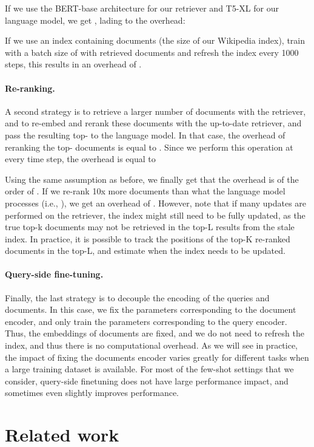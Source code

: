 \documentclass[10pt]{article} \usepackage[preprint]{tmlr}
\begin{document}
If we use the BERT-base architecture for our retriever and T5-XL for our language model, we get , lading to the overhead:

If we use an index containing  documents (the size of our Wikipedia index), train with a batch size of  with  retrieved documents and refresh the index every 1000 steps, this results in an overhead of . 

\paragraph{Re-ranking.}
A second strategy is to retrieve a larger number of documents  with the retriever, and to re-embed and rerank these documents with the up-to-date retriever, and pass the resulting top- to the language model.
In that case, the overhead of reranking the top- documents is equal to .
Since we perform this operation at every time step, the overhead is equal to

Using the same assumption as before, we finally get that the overhead is of the order of  .
If we re-rank 10x more documents than what the language model processes (i.e., ), we get an overhead of .
However, note that if many updates are performed on the retriever, the index might still need to be fully updated, as the true top-k documents may not be retrieved in the top-L results from the stale index.
In practice, it is possible to track the positions of the top-K re-ranked documents in the top-L, and estimate when the index needs to be updated.

\paragraph{Query-side fine-tuning.}
Finally, the last strategy is to decouple the encoding of the queries and documents.
In this case, we fix the parameters corresponding to the document encoder, and only train the parameters corresponding to the query encoder.
Thus, the embeddings of documents are fixed, and we do not need to refresh the index, and thus there is no computational overhead.
As we will see in practice, the impact of fixing the documents encoder varies greatly for different tasks when a large training dataset is available.
For most of the few-shot settings that we consider, query-side finetuning does not have large performance impact, and sometimes even slightly improves performance.

\section{Related work}
\end{document}

